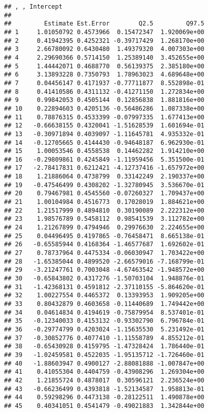 \documentclass[
]{article}
\begin{document}
\begin{verbatim}
## , , Intercept
## 
##         Estimate Est.Error        Q2.5         Q97.5
## 1     1.01050792 0.4573966  0.15472347  1.920069e+00
## 2     0.41942395 0.4252321 -0.39717429  1.268170e+00
## 3     2.66780092 0.6430480  1.49379320  4.007303e+00
## 4     2.29690366 0.5714150  1.25389140  3.452655e+00
## 5     1.44442071 0.4688770  0.56139375  2.385180e+00
## 6     3.13893228 0.7350793  1.78963023  4.689648e+00
## 7     0.04456147 0.4171937 -0.77711877  8.552898e-01
## 8     0.41410586 0.4311132 -0.41271150  1.272834e+00
## 9     0.99842053 0.4505144  0.12856838  1.881816e+00
## 10    0.22894603 0.4205136 -0.56486286  1.087338e+00
## 11    0.78876315 0.4533399 -0.07997335  1.677413e+00
## 12   -0.66638155 0.4320041 -1.51628539  1.601694e-01
## 13   -0.30971894 0.4039097 -1.11645781  4.935332e-01
## 14   -0.12705665 0.4144430 -0.94648187  6.962930e-01
## 15    1.00053546 0.4558538  0.14462282  1.914210e+00
## 16   -0.29809861 0.4245849 -1.11959456  5.351500e-01
## 17   -2.78417831 0.6212421 -4.12737416 -1.657972e+00
## 18    1.21886064 0.4738799  0.33142249  2.190337e+00
## 19   -0.47546499 0.4308202 -1.32780945  3.536670e-01
## 20    0.79467981 0.4545560 -0.07260327  1.709437e+00
## 21    1.00104984 0.4516773  0.17028019  1.884621e+00
## 22    1.21517999 0.4894810  0.30190089  2.222312e+00
## 23    1.98576789 0.5458112  0.98541539  3.112782e+00
## 24    1.21267899 0.4794946  0.29976630  2.224655e+00
## 25    0.04496495 0.4197865 -0.76458471  8.665138e-01
## 26   -0.65585944 0.4168364 -1.46577687  1.692602e-01
## 27    0.78737964 0.4475334 -0.06030947  1.703422e+00
## 28   -1.65385044 0.4899520 -2.66579016 -7.168799e-01
## 29   -3.21247761 0.7003048 -4.67463542 -1.948572e+00
## 30   -0.65843802 0.4317276 -1.50703104  1.948876e-01
## 31   -1.42368131 0.4591812 -2.37110155 -5.864620e-01
## 32    1.00227554 0.4465372  0.13393953  1.909205e+00
## 33    0.80432879 0.4603658 -0.11440689  1.749442e+00
## 34    0.04614834 0.4194619 -0.75879954  8.537401e-01
## 35   -0.12340033 0.4153132 -0.93302790  6.796784e-01
## 36   -0.29774799 0.4203024 -1.15635530  5.231492e-01
## 37   -0.30852776 0.4077410 -1.11558789  4.855212e-01
## 38   -0.65430928 0.4159795 -1.47328424  1.786440e-01
## 39   -1.02459581 0.4522035 -1.95135712 -1.726460e-01
## 40   -1.88603947 0.4900127 -2.88081888 -1.007847e+00
## 41    0.41055304 0.4404759 -0.43908296  1.269304e+00
## 42    1.21855724 0.4878017  0.30596121  2.236524e+00
## 43   -0.66236499 0.4393818 -1.52134587  1.958813e-01
## 44    0.59298296 0.4473138 -0.28122511  1.490878e+00
## 45    0.40341051 0.4541479 -0.49021883  1.342844e+00

\end{verbatim}
\end{document}
